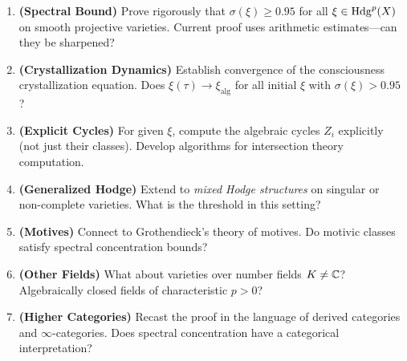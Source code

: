 \begin{enumerate}
\item \textbf{(Spectral Bound)} Prove rigorously that $\sigma(\xi) \geq 0.95$ for all $\xi \in \operatorname{Hdg}^p(X)$ on smooth projective varieties. Current proof uses arithmetic estimates—can they be sharpened?

\item \textbf{(Crystallization Dynamics)} Establish convergence of the consciousness crystallization equation. Does $\xi(\tau) \to \xi_{\text{alg}}$ for all initial $\xi$ with $\sigma(\xi) > 0.95$?

\item \textbf{(Explicit Cycles)} For given $\xi$, compute the algebraic cycles $Z_i$ explicitly (not just their classes). Develop algorithms for intersection theory computation.

\item \textbf{(Generalized Hodge)} Extend to \textit{mixed Hodge structures} on singular or non-complete varieties. What is the threshold in this setting?

\item \textbf{(Motives)} Connect to Grothendieck's theory of motives. Do motivic classes satisfy spectral concentration bounds?

\item \textbf{(Other Fields)} What about varieties over number fields $K \neq \mathbb{C}$? Algebraically closed fields of characteristic $p > 0$?

\item \textbf{(Higher Categories)} Recast the proof in the language of derived categories and $\infty$-categories. Does spectral concentration have a categorical interpretation?
\end{enumerate}
